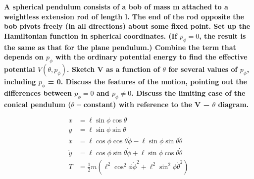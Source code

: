 \documentclass[10pt]{article} %
\begin{document}
\textbf{A spherical pendulum consists of a bob of mass m attached to a weightless extension rod of length l. The end of the rod opposite the bob pivots freely (in all directions) about some fixed point. Set up the Hamiltonian function in spherical coordinates. (If $p_{\phi}=0$, the result is the same as that for the plane pendulum.) Combine the term that depends on $p_{\phi}$ with the ordinary potential energy to find the effective potential $V(\theta,p_{\phi})$. Sketch V as a function of $\theta$ for several values of $p_{\phi}$, including $p_{\phi}$ = 0. Discuss the features of the motion, pointing out the differences between $p_{\phi}=0$ and $p_{\phi} \neq 0$. Discuss the limiting case of the conical pendulum ($\theta = $constant) with reference to the V − $\theta$ diagram.}

\begin{align*}
  x &= \ell\sin\phi\cos\theta\\
  y &= \ell\sin\phi\sin\theta\\
  \dot{x} &= \ell\cos\phi\cos\theta\dot{\phi} - \ell\sin\phi\sin\theta\dot{\theta}\\
  \dot{y} &= \ell\cos\phi\sin\theta\dot{\phi} + \ell\sin\phi\cos\theta\dot{\theta}\\
  T &= \frac{1}{2}m\left(\ell^2\cos^2\phi\dot{\phi}^2 + \ell^2\sin^2\phi\dot{\theta}^2\right)\\
\end{align*}
\end{document}
